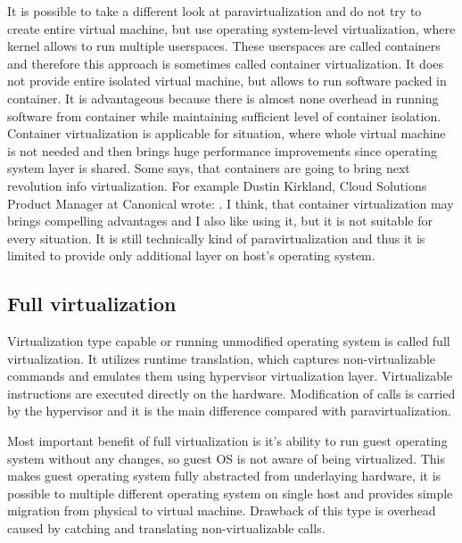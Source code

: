 It is possible to take a different look at paravirtualization and do not try to create entire virtual machine, but use operating system-level virtualization, where kernel allows to run multiple userspaces. These userspaces are called containers and therefore this approach is sometimes called container virtualization. It does not provide entire isolated virtual machine, but allows to run software packed in container. It is advantageous because there is almost none overhead in running software from container while maintaining sufficient level of container isolation. Container virtualization is applicable for situation, where whole virtual machine is not needed and then brings huge performance improvements since operating system layer is shared. Some says, that containers are going to bring next revolution info virtualization. For example Dustin Kirkland, Cloud Solutions Product Manager at Canonical wrote:  \cite{ubuntu-docker}. I think, that container virtualization may brings compelling advantages and I also like using it, but it is not suitable for every situation. It is still technically kind of paravirtualization and thus it is limited to provide only additional layer on host's operating system.

\subsection{Full virtualization}
Virtualization type capable or running unmodified operating system is called full virtualization. It utilizes runtime translation, which captures non-virtualizable commands and emulates them using hypervisor virtualization layer. Virtualizable instructions are executed directly on the hardware. Modification of  calls is carried by the hypervisor and it is the main difference compared with paravirtualization. 

Most important benefit of full virtualization is it's ability to run guest operating system without any changes, so guest \Ac{OS} is not aware of being virtualized. This makes guest operating system fully abstracted from underlaying hardware, it is possible to multiple different operating system on single host and provides simple migration from physical to virtual machine. Drawback of this type is overhead caused by catching and translating non-virtualizable calls. 

